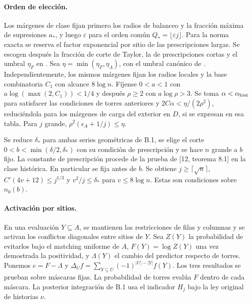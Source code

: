 \paragraph{Orden de elección.}
Los márgenes de clase fijan primero los radios de balanceo y la fracción máxima de
supresiones \(a_*\), y luego \(\varepsilon\) para el orden común
\(Q_*=\lfloor\varepsilon j\rfloor\). Para la norma exacta se reserva el factor exponencial
por sitio de las prescripciones largas. Se escogen después la fracción de corte de Taylor,
la de prescripciones cortas y el umbral \(\eta_F\) en .
Sea \(\eta=\min(\eta_F,\eta_\Lambda)\), con el umbral canónico de .
Independientemente, los mismos márgenes fijan los radios locales y la base combinatoria
\(C_1\) con alcance \(8\log n\). Fíjense \(0<a<1\) con
\(a\log(\max(2,C_1))<1/4\) y después \(\rho\ge2\) con \(a\log\rho>3\).
Se toma \(\alpha<\alpha_{\rm hist}\) para satisfacer las condiciones de torres anteriores y
\(2C\alpha<\eta/(2\rho^2)\), reduciéndola para los márgenes de carga del exterior en \(D\),
si se expresan en esa tabla. Para \(j\) grande, \(\rho^2(\epsilon_A+1/j)\le\eta\).

Se reduce \(\delta_*\) para ambas series geométricas de B.1, se elige el corte
\(0<b<\min(\delta/2,\delta_*)\) con su condición de prescripción y se hace \(n\) grande
a \(b\) fijo. La constante de prescripción procede de la prueba de [12, teorema 8.1]
en la clase histórica. En particular se fija antes de \(b\). Se obtiene
\(j\ge\lceil\sqrt n\rceil\), \(C'(4v+12)\le j^{1/3}\) y \(v^2/j\le\delta_*\)
para \(v\le8\log n\). Estas son condiciones sobre \(n_0(b)\).

\paragraph{Activación por sitios.}
En una evaluación \(Y\subseteq A\), se mantienen las restricciones de filas y columnas
y se activan los conflictos diagonales entre sitios de \(Y\). Sea \(Z(Y)\) la probabilidad
de evitarlos bajo el matching uniforme de \(A\), \(F(Y)=\log Z(Y)\) una vez demostrada
la positividad, y \(\Lambda(Y)\) el cambio del predictor respecto de torres.
Ponemos \(e=F-\Lambda\) y
\(\Delta_U f=\sum_{Y\subseteq U}(-1)^{|U|-|Y|}f(Y)\).
Los tres resultados se prueban sobre máscaras fijas. La probabilidad de torres evalúa
\(F\) dentro de cada máscara. La posterior integración de B.1 usa el indicador \(H_j\)
bajo la ley original de historias \(\nu\).
